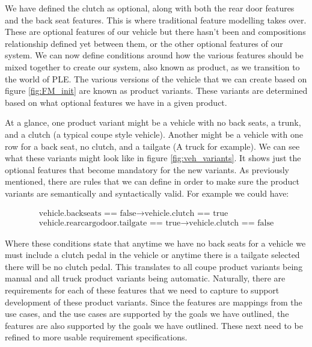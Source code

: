 %	

We have defined the clutch as optional, along with both the rear door features and the back seat features. This is where traditional feature modelling takes over. These are optional features of our vehicle but there hasn't been and compositions relationship defined yet between them, or the other optional features of our system. We can now define conditions around how the various features should be mixed together to create our system, also known as product, as we transition to the world of \ac{PLE}. The various versions of the vehicle that we can create based on figure \ref{fig:FM_init} are known as product variants. These variants are determined based on what optional features we have in a given product.

At a glance, one product variant might be a vehicle with no back seats, a trunk, and a clutch (a typical coupe style vehicle). Another might be a vehicle with one row for a back seat, no clutch, and a tailgate (A truck for example). We can see what these variants might look like in figure \ref{fig:veh_variants}. It shows just the optional features that become mandatory for the new variants. As previously mentioned, there are rules that we can define in order to make sure the product variants are semantically and syntactically valid. For example we could have:

\begin{gather}
	\text{vehicle.backseats == false} \rightarrow \text{vehicle.clutch == true}\\
	\text{vehicle.rearcargodoor.tailgate == true} \rightarrow \text{vehicle.clutch == false}
\end{gather}

Where these conditions state that anytime we have no back seats for a vehicle we must include a clutch pedal in the vehicle or anytime there is a tailgate selected there will be no clutch pedal. This translates to all coupe product variants being manual and all truck product variants being automatic. Naturally, there are requirements for each of these features that we need to capture to support development of these product variants. Since the features are mappings from the use cases, and the use cases are supported by the goals we have outlined, the features are also supported by the goals we have outlined. These next need to be refined to more usable requirement specifications.

